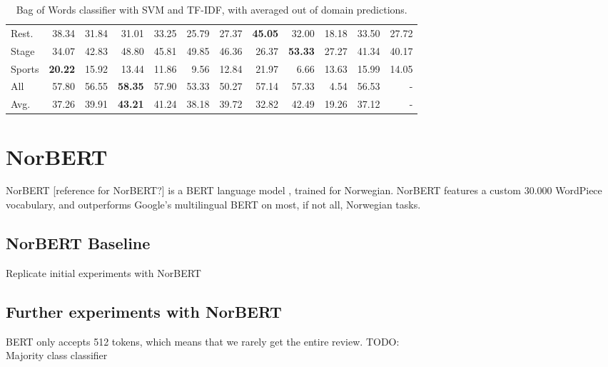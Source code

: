 \begin{table}[]
{\begin{tabular}{@{}lrrrrrrrrrrr@{}}
		\multicolumn{1}{l}{Rest.}      & 38.34                      & 31.84                     & 31.01                     & 33.25                          & 25.79                        & 27.37                     & \textbf{45.05}             & 32.00                      & 18.18                      & 33.50    & 27.72              \\
		\multicolumn{1}{l}{Stage}      & 34.07                       & 42.83                     & 48.80                    & 45.81                          & 49.85                        & 46.36                     & 26.37                     & \textbf{53.33}            & 27.27                      & 41.34     & 40.17             \\
		\multicolumn{1}{l}{Sports}     & \textbf{20.22}                      & 15.92                      & 13.44                    & 11.86                          & 9.56                        & 12.84                     & 21.97                      & 6.66                     & 13.63             & 15.99  & 14.05                  \\
		\multicolumn{1}{l}{All}        & 57.80                      & 56.55                     & \textbf{58.35}            & 57.90                          & 53.33                        & 50.27                     & 57.14                     & 57.33                     & 4.54                      & 56.53 & - \\
		\multicolumn{1}{l}{Avg.}        & 37.26                      & 39.91                     & \textbf{43.21}            & 41.24                          & 38.18                       & 39.72                     & 32.82                     & 42.49                     & 19.26                      & 37.12    & -                  
	\end{tabular}%
}
	\caption{Bag of Words classifier with SVM and TF-IDF, with averaged out of domain predictions.}
	\label{tab:bow}
\end{table}

\section{NorBERT}
NorBERT [reference for NorBERT?] is a BERT language model \cite{devlin-etal-2019-bert}, trained for Norwegian. NorBERT features a custom 30.000 WordPiece vocabulary, and outperforms Google's multilingual BERT on most, if not all, Norwegian tasks. 
\subsection{NorBERT Baseline}
Replicate initial experiments with NorBERT

\subsection{Further experiments with NorBERT}
BERT only accepts 512 tokens, which means that we rarely get the entire review.
TODO:\\
Majority class classifier\\

